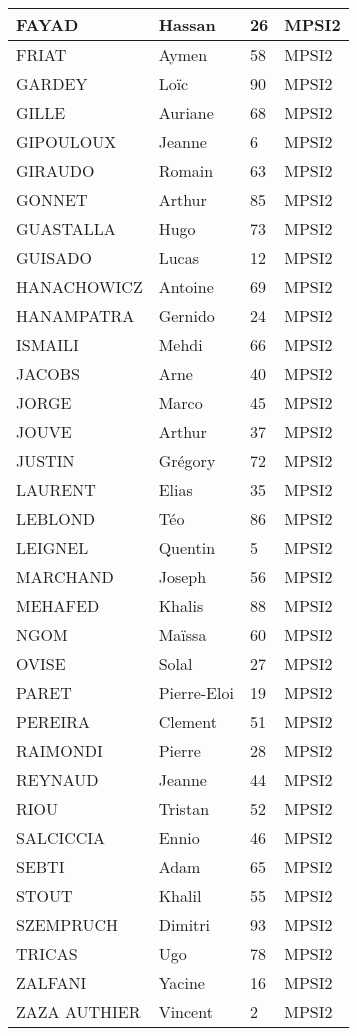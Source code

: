 \documentclass[francais,a4paper,div=19,12 pt]{scrartcl}
\begin{document}
\begin{center}
\begin{longtable}{|p{}|p{}|p{}|p{}|}
\hline
FAYAD & Hassan & 26 & MPSI2\\
\hline
FRIAT  & Aymen & 58 & MPSI2\\
\hline
GARDEY & Loïc & 90 & MPSI2\\
\hline
GILLE  & Auriane & 68 & MPSI2\\
\hline
GIPOULOUX  & Jeanne & 6 & MPSI2\\
\hline
GIRAUDO  & Romain & 63 & MPSI2\\
\hline
GONNET  & Arthur & 85 & MPSI2\\
\hline
GUASTALLA  & Hugo & 73 & MPSI2\\
\hline
GUISADO  & Lucas & 12 & MPSI2\\
\hline
HANACHOWICZ  & Antoine & 69 & MPSI2\\
\hline
HANAMPATRA  & Gernido & 24 & MPSI2\\
\hline
ISMAILI  & Mehdi & 66 & MPSI2\\
\hline
JACOBS  & Arne & 40 & MPSI2\\
\hline
JORGE  & Marco & 45 & MPSI2\\
\hline
JOUVE  & Arthur & 37 & MPSI2\\
\hline
JUSTIN  & Grégory & 72 & MPSI2\\
\hline
LAURENT  & Elias & 35 & MPSI2\\
\hline
LEBLOND  & Téo & 86 & MPSI2\\
\hline
LEIGNEL  & Quentin & 5 & MPSI2\\
\hline
MARCHAND  & Joseph & 56 & MPSI2\\
\hline
MEHAFED  & Khalis & 88 & MPSI2\\
\hline
NGOM & Maïssa & 60 & MPSI2\\
\hline
OVISE  & Solal & 27 & MPSI2\\
\hline
PARET  & Pierre-Eloi & 19 & MPSI2\\
\hline
PEREIRA  & Clement & 51 & MPSI2\\
\hline
RAIMONDI  & Pierre & 28 & MPSI2\\
\hline
REYNAUD  & Jeanne & 44 & MPSI2\\
\hline
RIOU  & Tristan & 52 & MPSI2\\
\hline
SALCICCIA  & Ennio & 46 & MPSI2\\
\hline
SEBTI  & Adam & 65 & MPSI2\\
\hline
STOUT  & Khalil & 55 & MPSI2\\
\hline
SZEMPRUCH  & Dimitri & 93 & MPSI2\\
\hline
TRICAS  & Ugo & 78 & MPSI2\\
\hline
ZALFANI  & Yacine & 16 & MPSI2\\
\hline
ZAZA AUTHIER  & Vincent & 2 & MPSI2\\
\hline
\end{longtable}
\end{center}
\end{document}

